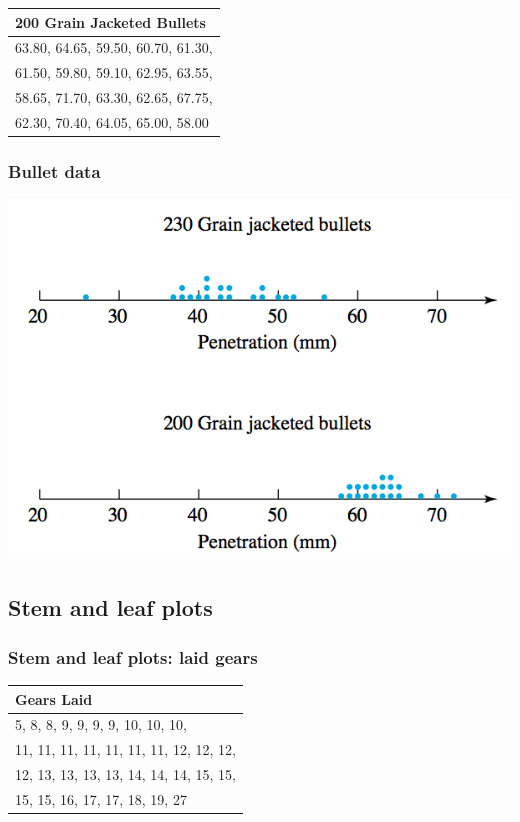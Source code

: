 \documentclass[handout]{beamer}
\numberwithin{equation}{section}
\begin{document}
\begin{frame}[t]
\begin{tabular}{l}
\hline
200 Grain Jacketed Bullets\\ \hline
63.80, 64.65, 59.50, 60.70, 61.30, \\
61.50, 59.80, 59.10, 62.95, 63.55, \\
58.65, 71.70, 63.30, 62.65, 67.75,\\ 
62.30, 70.40, 64.05, 65.00, 58.00\\\hline
\end{tabular}
\end{frame}

\begin{frame}
\frametitle{Bullet data}
\begin{center}
 \includegraphics{../../fig/bulletdot.png}
\end{center}
\end{frame}



\subsection{Stem and leaf plots}
\begin{frame}[t]
\frametitle{Stem and leaf plots: laid gears}
\begin{tabular}{l}
\hline
Gears Laid\\ \hline
5, 8, 8, 9, 9, 9, 9, 10, 10, 10,\\
11, 11, 11, 11, 11, 11, 11, 12, 12, 12,\\
12, 13, 13, 13, 13, 14, 14, 14, 15, 15,\\
15, 15, 16, 17, 17, 18, 19, 27\\\hline
\end{tabular}
\end{frame}
\end{document}
